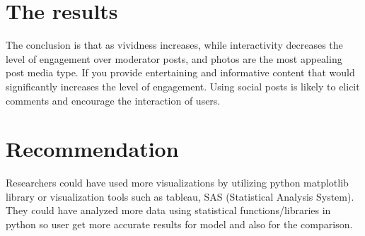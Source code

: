 \documentclass[a4paper]{article}
\begin{document}
\section{The results}
 
The conclusion is that as vividness increases, while interactivity decreases the level of engagement over moderator posts, and photos are the most appealing post media type. If you provide entertaining and informative content that would significantly increases the level of engagement. Using social posts is likely to elicit comments and encourage the interaction of users.


\section{Recommendation}

Researchers could have used more visualizations by utilizing python matplotlib library or visualization tools such as tableau, SAS (Statistical Analysis System). They could have analyzed more data using statistical functions/libraries in python so user get more accurate results for model and also for the comparison.
\end{document}
